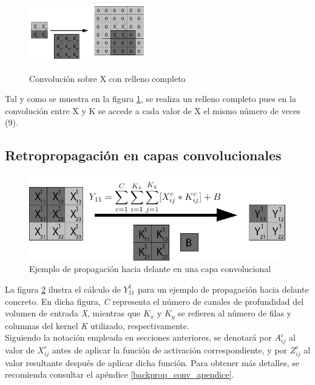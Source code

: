 \begin{figure}[H]
{		\includegraphics[width=0.45\textwidth]{imagenes/conv_padding_15.jpg}%
		\label{fig:sub15}%
	}\hfill
	\\
	
	\caption{Convolución sobre X con relleno completo}
	\label{fig:full_padding}
\end{figure}

Tal y como se muestra en la figura \ref{fig:full_padding}, se realiza un relleno completo pues en la convolución entre X y K se accede a cada valor de X el mismo número de veces (9).


\subsection{Retropropagación en capas convolucionales}

\begin{figure}[H]
	\centering
	\includegraphics[width=0.8\linewidth]{imagenes/conv_ejemplo_backprop_1.jpg} 
	\caption{Ejemplo de propagación hacia delante en una capa convolucional}
	\label{fig:ejemplo_forward_prop_convolucional}
\end{figure}

La figura \ref{fig:ejemplo_forward_prop_convolucional} ilustra el cálculo de $Y^1_{11}$ para un ejemplo de propagación hacia delante concreto. En dicha figura, \textit{C} representa el número de canales de profundidad del volumen de entrada \textit{X}, mientras que ${K_x}$ y ${K_y}$ se refieren al número de filas y columnas del kernel \textit{K} utilizado, respectivamente. \\
Siguiendo la notación empleada en secciones anteriores, se denotará por $A^c_{ij}$ al valor de $X^c_{ij}$ antes de aplicar la función de activación correspondiente, y por $Z^c_{ij}$ al valor resultante después de aplicar dicha función. Para obtener más detalles, se recomienda consultar el apéndice \ref{backprop_conv_apendice}.

